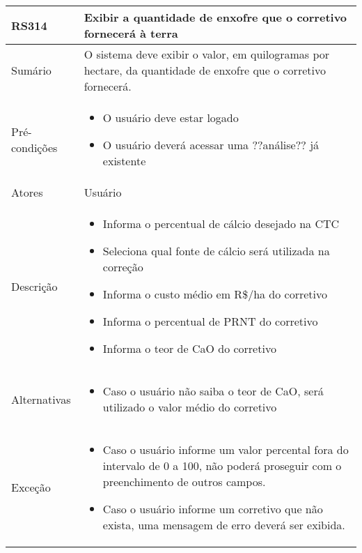 \begin{quadro}[!htb]
    \begin{tabular}{|p{3cm}|p{11cm}|}
        \hline
        \textbf{RS314} & \textbf{Exibir a quantidade de enxofre que o corretivo fornecerá à terra} \\
        \hline
        Sumário        & O sistema deve exibir o valor, em quilogramas por hectare, da quantidade de enxofre que o corretivo fornecerá.                  \\
        \hline
        Pré-condições  & \begin{itemize}
            \item O usuário deve estar logado
            \item O usuário deverá acessar uma ??análise?? já existente 
        \end{itemize}                 \\
        \hline
        Atores         & Usuário                  \\
        \hline
        Descrição      &
        \begin{itemize}
            \item Informa o percentual de cálcio desejado na CTC
            \item Seleciona qual fonte de cálcio será utilizada na correção
            \item Informa o custo médio em R\$/ha do corretivo
            \item Informa o percentual de PRNT do corretivo
            \item Informa o teor de CaO do corretivo
        \end{itemize}                 \\
        \hline
        Alternativas   &
        \begin{itemize}
            \item Caso o usuário não saiba o teor de CaO, será utilizado o valor médio do corretivo
        \end{itemize}                 \\
        \hline
        Exceção        &
        \begin{itemize}
            \item Caso o usuário informe um valor percental fora do intervalo de 0 a 100, não poderá proseguir com o preenchimento de outros campos.
            \item Caso o usuário informe um corretivo que não exista, uma mensagem de erro deverá ser exibida.
        \end{itemize}                   \\
        \hline
    \end{tabular}
\end{quadro}

